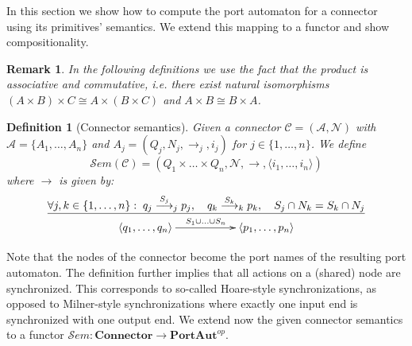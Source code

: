 \documentclass[copyright,creativecommons]{eptcs}
\newtheorem{definition}{Definition}
\newtheorem{remark}{Remark}
\newcommand{\PA}{\ensuremath{\mathbf{PortAut}}}
\newcommand{\Connector}{\ensuremath{\mathbf{Connector}}}
\newcommand{\Sem}{\ensuremath{\mathcal{S}em}}
\newcommand{\N}{\ensuremath{\mathcal{N}}}
\newcommand{\A}{\ensuremath{\mathcal{A}}}
\newcommand{\C}{\ensuremath{\mathcal{C}}}
\begin{document}
In this section we show how to compute the port automaton for 
a connector using its primitives' semantics. We extend 
this mapping to a functor and show compositionality.

\begin{remark}
In the following definitions we use the fact that the product
is associative and commutative, i.e. there exist
natural isomorphisms $(A \times B) \times C \cong A \times (B \times C)$ 
and $A \times B \cong B \times A$.
\end{remark}
\begin{definition}[Connector semantics] 
\label{def:connector-sem}
Given a connector $\C=(\A,\N)$ with $\A=\{A_1,\ldots, A_n\}$ and 
$A_j = (Q_j,N_j, \to_j, i_j)$ for $j\in \{1,\ldots,n\}$. We define
\[
\Sem(\C)=(Q_1 \times \ldots \times Q_n,\N,\to,\langle i_1, \ldots,i_n
\rangle)
\] 
where $\to$ is given by:
\begin{equation}
\frac{
\forall j,k \in \{1,\ldots,n\}: \; 
 q_j \overset{S_j}{\longrightarrow}_j p_j, \quad 
 q_k \overset{S_k}{\longrightarrow}_k p_k, \quad
 S_j \cap N_k = S_k \cap N_j
}
{
 \xymatrix{
	\langle q_1,\ldots,q_n \rangle 
	\ar[rr]^{S_1 \cup \ldots \cup S_n} &&
	\langle p_1,\ldots,p_n \rangle }
}
\label{rule:connector-sem}
\end{equation}
\end{definition}
Note that the nodes of the connector become the port names
of the resulting port automaton. The definition further
implies that all actions on a (shared) node are synchronized. 
This corresponds to so-called Hoare-style synchronizations, as
opposed to Milner-style synchronizations where exactly one
input end is synchronized with one output end.
We extend now the given connector semantics to a functor
$\Sem: \Connector \to \PA^{op}$.
\end{document}
